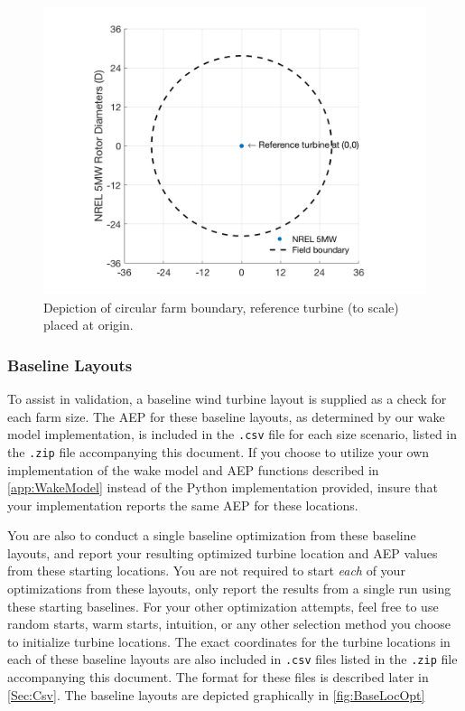 \documentclass[12pt]{article}
\begin{document}
    \begin{figure}[H]
        \centering
        \includegraphics[width=.65\linewidth]{EmptyOptField.png}
        \caption{Depiction of circular farm boundary, reference turbine (to scale) placed at origin.}
        \label{fig:EmptyFarm}
    \end{figure}
    
\subsubsection{Baseline Layouts}\label{Sec:Baseline}
To assist in validation, a baseline wind turbine layout is supplied as a check for each farm size. The AEP for these baseline layouts, as determined by our wake model implementation, is included in the \texttt{.csv} file for each size scenario, listed in the \texttt{.zip} file accompanying this document. If you choose to utilize your own implementation of the wake model and AEP functions described in \cref{app:WakeModel} instead of the Python implementation provided, insure that your implementation reports the same AEP for these locations.

You are also to conduct a single baseline optimization from these baseline layouts, and report your resulting optimized turbine location and AEP values from these starting locations. You are not required to start \textit{each} of your optimizations from these layouts, only report the results from a single run using these starting baselines. For your other optimization attempts, feel free to use random starts, warm starts, intuition, or any other selection method you choose to initialize turbine locations. The exact coordinates for the turbine locations in each of these baseline layouts are also included in \texttt{.csv} files listed in the \texttt{.zip} file accompanying this document. The format for these files is described later in \cref{Sec:Csv}. The baseline layouts are depicted graphically in \cref{fig:BaseLocOpt}
\end{document}
